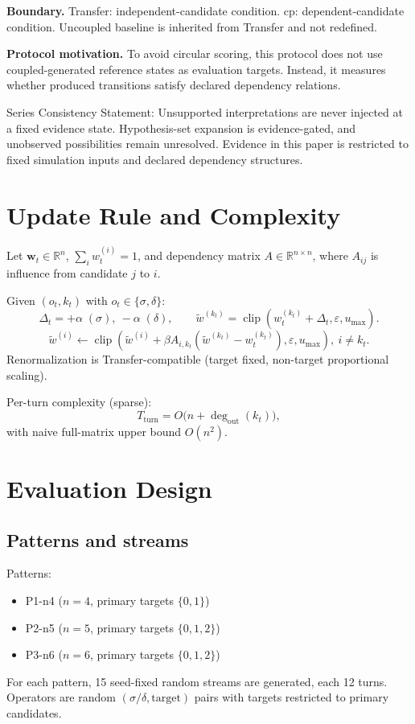 \documentclass[11pt,a4paper]{article}
\begin{document}
\textbf{Boundary.}
Transfer: independent-candidate condition.
cp: dependent-candidate condition.
Uncoupled baseline is inherited from Transfer and not redefined.

\textbf{Protocol motivation.}
To avoid circular scoring, this protocol does not use coupled-generated reference states as evaluation targets. Instead, it measures whether produced transitions satisfy declared dependency relations.

Series Consistency Statement: Unsupported interpretations are never injected at a fixed evidence state. Hypothesis-set expansion is evidence-gated, and unobserved possibilities remain unresolved. Evidence in this paper is restricted to fixed simulation inputs and declared dependency structures.

\section{Update Rule and Complexity}
Let \(\mathbf{w}_t\in\mathbb{R}^n\), \(\sum_i w_t^{(i)}=1\), and dependency matrix \(A\in\mathbb{R}^{n\times n}\), where \(A_{ij}\) is influence from candidate \(j\) to \(i\).

Given \((o_t,k_t)\) with \(o_t\in\{\sigma,\delta\}\):
\[
\Delta_t = +\alpha\;(\sigma),\ -\alpha\;(\delta),\qquad
\tilde{w}^{(k_t)}=\operatorname{clip}(w_t^{(k_t)}+\Delta_t,\varepsilon,u_{\max}).
\]
\[
\tilde{w}^{(i)} \leftarrow \operatorname{clip}(\tilde{w}^{(i)}+\beta A_{i,k_t}(\tilde{w}^{(k_t)}-w_t^{(k_t)}),\varepsilon,u_{\max}),\ i\neq k_t.
\]
Renormalization is Transfer-compatible (target fixed, non-target proportional scaling).

Per-turn complexity (sparse):
\[
T_{\text{turn}}=O\big(n+\deg_{\text{out}}(k_t)\big),
\]
with naive full-matrix upper bound \(O(n^2)\).

\section{Evaluation Design}
\subsection{Patterns and streams}
Patterns:
\begin{itemize}
  \item P1-n4 (\(n=4\), primary targets \(\{0,1\}\))
  \item P2-n5 (\(n=5\), primary targets \(\{0,1,2\}\))
  \item P3-n6 (\(n=6\), primary targets \(\{0,1,2\}\))
\end{itemize}
For each pattern, 15 seed-fixed random streams are generated, each 12 turns.
Operators are random \((\sigma/\delta,\text{target})\) pairs with targets restricted to primary candidates.
\end{document}
